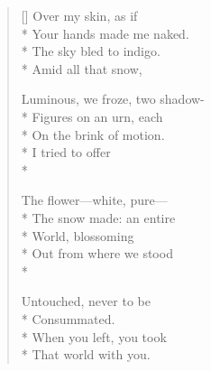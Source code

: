 \begin{verse}[\versewidth]
Over my skin, as if\\*
Your hands made me naked.\\*
The sky bled to indigo.\\*
Amid all that snow,

Luminous, we froze, two shadow-\\*
Figures on an urn, each\\*
On the brink of motion.\\*
I tried to offer\\*

The flower---white, pure---\\*
The snow made: an entire \\*
World, blossoming\\*
Out from where we stood\\*

Untouched, never to be\\*
Consummated.\\*
When you left, you took\\*
That world with you.
\end{verse}
